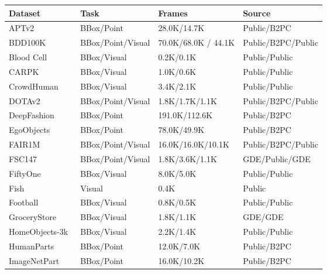 \begin{table}[htbp]
    \centering
    \small
    \setlength{\tabcolsep}{5pt}
    \renewcommand{\arraystretch}{0.88}
    \begin{tabular}{l|l|l|l}
        \toprule
        Dataset & Task & Frames & Source \\
        \midrule
        APTv2~\cite{yang2023aptv2benchmarkinganimalpose} & BBox/Point & 28.0K/14.7K & Public/B2PC \\
        BDD100K~\cite{yu2020bdd100k} & BBox/Point/Visual & 70.0K/68.0K / 44.1K & Public/B2PC/Public \\
        Blood Cell~\cite{blood-cell-detection-1ekwu_dataset} & BBox/Visual & 0.2K/0.1K & Public/Public \\
        CARPK~\cite{Hsieh_2017_ICCV} & BBox/Visual & 1.0K/0.6K & Public/Public \\
        CrowdHuman~\cite{shao2018crowdhumanbenchmarkdetectinghuman} & BBox/Visual & 3.4K/2.1K & Public/Public \\
        DOTAv2~\cite{Ding_2022} & BBox/Point/Visual & 1.8K/1.7K/1.1K & Public/B2PC/Public \\
        DeepFashion~\cite{liuLQWTcvpr16DeepFashion} & BBox/Point & 191.0K/112.6K & Public/B2PC \\
        EgoObjects~\cite{zhu2023egoobjects} & BBox/Point & 78.0K/49.9K & Public/B2PC \\
        FAIR1M~\cite{SUN2022116} & BBox/Point/Visual & 16.0K/16.0K/10.1K & Public/B2PC/Public \\
        FSC147~\cite{amininaieni2023openworldtextspecifiedobjectcounting} & BBox/Point/Visual & 1.8K/3.6K/1.1K & GDE/Public/GDE \\
        FiftyOne~\cite{shubh303_dense_object_detection_fiftyone_2026} & BBox/Visual & 8.0K/5.0K & Public/Public \\
        Fish~\cite{solawetz_fish_dataset_2020} & Visual & 0.4K & Public \\
        Football~\cite{football-player-detection-kucab_dataset} & BBox/Visual & 0.8K/0.5K & Public/Public \\
        GroceryStore~\cite{klasson2019hierarchical} & BBox/Visual & 1.8K/1.1K & GDE/GDE \\
        HomeObjects-3k~\cite{Jocher_Ultralytics_Datasets_2025} & BBox/Visual & 2.2K/1.4K & Public/Public \\
        HumanParts~\cite{li2019detector} & BBox/Point & 12.0K/7.0K & Public/B2PC \\
        ImageNetPart~\cite{he2022partimagenet} & BBox/Point & 16.0K/10.2K & Public/B2PC \\

\end{tabular}
\end{table}
